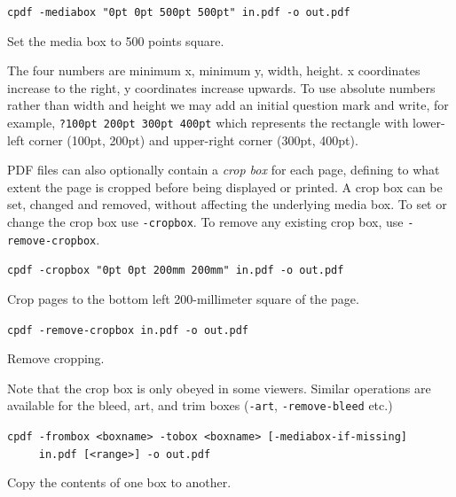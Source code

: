 \documentclass{book}
\begin{document}
  \begin{framed}
  \noindent\small\verb!cpdf -mediabox "0pt 0pt 500pt 500pt" in.pdf -o out.pdf!

  \vspace{2.5mm}
  \noindent Set the media box to 500 points square.
  \end{framed}

  \noindent The four numbers are minimum x, minimum y, width, height. x
coordinates increase to the right, y coordinates increase upwards. To use absolute numbers rather than width and height we may add an initial question mark and write, for example, \texttt{?100pt 200pt 300pt 400pt} which represents the rectangle with lower-left corner (100pt, 200pt) and upper-right corner (300pt, 400pt).

  PDF files can also optionally contain a \textit{crop box} for each page,
defining to what extent the page is cropped before being displayed or printed.
A crop box can be set, changed and removed, without affecting the underlying
media box. To set or change the crop box use \texttt{-cropbox}. To remove any
existing crop box, use \texttt{-remove-cropbox}.

  \begin{framed}
  \noindent\small\verb!cpdf -cropbox "0pt 0pt 200mm 200mm" in.pdf -o out.pdf!

  \vspace{2.5mm}
  \noindent Crop pages to the bottom left 200-millimeter square of the page.

  \vspace{2.5mm}
  \noindent\verb!cpdf -remove-cropbox in.pdf -o out.pdf!
  
  \vspace{2.5mm}
  \noindent Remove cropping.
  \end{framed}

\noindent Note that the crop box is only obeyed in some viewers. Similar operations are available for the bleed, art, and trim boxes (\texttt{-art}, \texttt{-remove-bleed} etc.)

  \begin{framed}
  \small\noindent\verb!cpdf -frombox <boxname> -tobox <boxname> [-mediabox-if-missing]! \\
  \noindent\verb!     in.pdf [<range>] -o out.pdf!

  \vspace{2.5mm}
  \noindent Copy the contents of one box to another.

  \end{framed}
\end{document}
